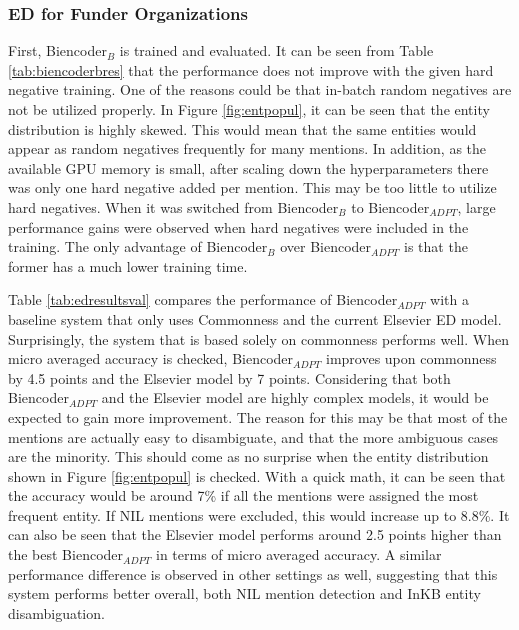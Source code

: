 \documentclass{report}
\theoremstyle{definition}
\theoremstyle{remark}
\begin{document}
\subsubsection{ED for Funder Organizations}

First, Biencoder$_B$ is trained and evaluated. It can be seen from Table \ref{tab:biencoderbres} that the performance does not improve with the given hard negative training. One of the reasons could be that in-batch random negatives are not be utilized properly. In Figure \ref{fig:entpopul}, it can be seen that the entity distribution is highly skewed. This would mean that the same entities would appear as random negatives frequently for many mentions. In addition, as the available GPU memory is small, after scaling down the hyperparameters there was only one hard negative added per mention. This may be too little to utilize hard negatives. When it was switched from Biencoder$_B$ to Biencoder$_{ADPT}$, large performance gains were observed when hard negatives were included in the training. The only advantage of Biencoder$_B$ over Biencoder$_{ADPT}$ is that the former has a much lower training time.

Table \ref{tab:edresultsval} compares the performance of Biencoder$_{ADPT}$ with a baseline system that only uses Commonness and the current Elsevier ED model. Surprisingly, the system that is based solely on commonness performs well. When micro averaged accuracy is checked, Biencoder$_{ADPT}$ improves upon commonness by 4.5 points and the Elsevier model by 7 points. Considering that both Biencoder$_{ADPT}$ and the Elsevier model are highly complex models, it would be expected to gain more improvement. The reason for this may be that most of the mentions are actually easy to disambiguate, and that the more ambiguous cases are the minority. This should come as no surprise when the entity distribution shown in Figure \ref{fig:entpopul} is checked. With a quick math, it can be seen that the accuracy would be around 7\% if all the mentions were assigned the most frequent entity. If NIL mentions were excluded, this would increase up to 8.8\%. It can also be seen that the Elsevier model performs around 2.5 points higher than the best Biencoder$_{ADPT}$ in terms of micro averaged accuracy. A similar performance difference is observed in other settings as well, suggesting that this system performs better overall, both NIL mention detection and InKB entity disambiguation.
\end{document}
